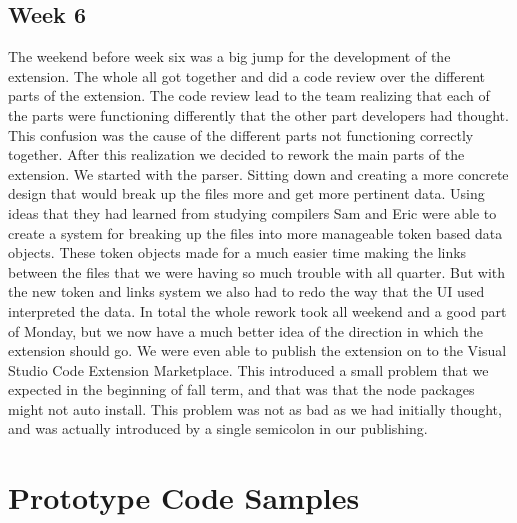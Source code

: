 \documentclass[letterpaper,10pt,titlepage,draftclsnofoot,onecolumn,onesided] {IEEEtran}
\begin{document}
	\subsection{Week 6}
	The weekend before week six was a big jump for the development of the extension. 
	The whole all got together and did a code review over the different parts of the extension.
	The code review lead to the team realizing that each of the parts were functioning differently that the other part developers had thought. 
	This confusion was the cause of the different parts not functioning correctly together. 
	After this realization we decided to rework the main parts of the extension.
	We started with the parser. 
	Sitting down and creating a more concrete design that would break up the files more and get more pertinent data.
	Using ideas that they had learned from studying compilers Sam and Eric were able to create a system for breaking up the files into more manageable token based data objects. 
	These token objects made for a much easier time making the links between the files that we were having so much trouble with all quarter. 
	But with the new token and links system we also had to redo the way that the UI used interpreted the data.
	In total the whole rework took all weekend and a good part of Monday, but we now have a much better idea of the direction in which the extension should go.
	We were even able to publish the extension on to the Visual Studio Code Extension Marketplace. 
	This introduced a small problem that we expected in the beginning of fall term, and that was that the node packages might not auto install. 
	This problem was not as bad as we had initially thought, and was actually introduced by a single semicolon in our publishing.
	
\section{Prototype Code Samples}	

\pagebreak
\end{document}
